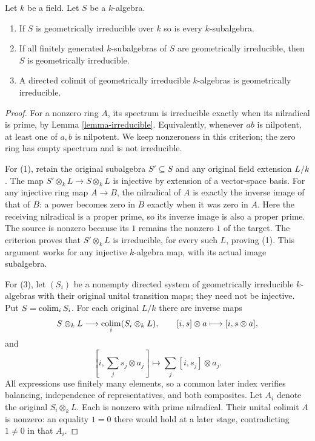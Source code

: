 \begin{lemma}
\label{lemma-subalgebra-geometrically-irreducible}
Let $k$ be a field. Let $S$ be a $k$-algebra.
\begin{enumerate}
\item If $S$ is geometrically irreducible over $k$ so is every
$k$-subalgebra.
\item If all finitely generated $k$-subalgebras of $S$ are
geometrically irreducible, then $S$ is geometrically irreducible.
\item A directed colimit of geometrically irreducible $k$-algebras
is geometrically irreducible.
\end{enumerate}
\end{lemma}

\begin{proof}
For a nonzero ring $A$, its spectrum
is irreducible exactly when its
nilradical is prime, by Lemma
\ref{lemma-irreducible}. Equivalently,
whenever $ab$ is nilpotent, at
least one of $a,b$ is nilpotent.
We keep nonzeroness in this
criterion; the zero ring has
empty spectrum and is not
irreducible.

For (1), retain the original
subalgebra $S'\subseteq S$ and
any original field extension
$L/k$. The map
$S'\otimes_k L\to S\otimes_k L$
is injective by extension of
a vector-space basis. For any
injective ring map $A\to B$,
the nilradical of $A$ is exactly
the inverse image of that of
$B$: a power becomes zero in
$B$ exactly when it was zero
in $A$. Here the receiving
nilradical is a proper prime,
so its inverse image is also
a proper prime. The source is
nonzero because its $1$ remains
the nonzero $1$ of the target.
The criterion proves that
$S'\otimes_k L$ is irreducible,
for every such $L$, proving (1).
This argument works for any
injective $k$-algebra map, with
its actual image subalgebra.

For (3), let $(S_i)$ be a
nonempty directed system of
geometrically irreducible
$k$-algebras with their original
unital transition maps; they
need not be injective. Put
$S=\mathop{\rm colim}_i S_i$.
For each original $L/k$ there
are inverse maps
$$
S\otimes_k L\longrightarrow
\mathop{\rm colim}_i(S_i\otimes_k L),
\qquad [i,s]\otimes a\longmapsto[i,s\otimes a],
$$
and
$$
[i,\sum_j s_j\otimes a_j]
\longmapsto\sum_j[i,s_j]\otimes a_j.
$$
All expressions use finitely
many elements, so a common
later index verifies balancing,
independence of representatives,
and both composites. Let $A_i$
denote the original $S_i\otimes_k L$.
Each is nonzero with prime
nilradical. Their unital colimit
$A$ is nonzero: an equality
$1=0$ there would hold at a
later stage, contradicting
$1\neq0$ in that $A_i$.


\end{proof}
